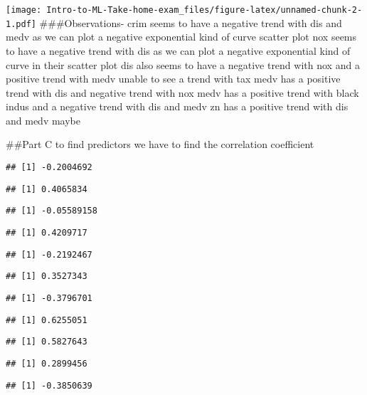 \documentclass[
]{article}
\begin{document}
\texttt{[image: Intro-to-ML-Take-home-exam\_files/figure-latex/unnamed-chunk-2-1.pdf]}
\#\#\#Observations- crim seems to have a negative trend with dis and
medv as we can plot a negative exponential kind of curve scatter plot
nox seems to have a negative trend with dis as we can plot a negative
exponential kind of curve in their scatter plot dis also seems to have a
negative trend with nox and a positive trend with medv unable to see a
trend with tax medv has a positive trend with dis and negative trend
with nox medv has a positive trend with black indus and a negative trend
with dis and medv zn has a positive trend with dis and medv maybe

\#\#Part C to find predictors we have to find the correlation
coefficient

\begin{verbatim}
## [1] -0.2004692
\end{verbatim}

\begin{verbatim}
## [1] 0.4065834
\end{verbatim}

\begin{verbatim}
## [1] -0.05589158
\end{verbatim}

\begin{verbatim}
## [1] 0.4209717
\end{verbatim}

\begin{verbatim}
## [1] -0.2192467
\end{verbatim}

\begin{verbatim}
## [1] 0.3527343
\end{verbatim}

\begin{verbatim}
## [1] -0.3796701
\end{verbatim}

\begin{verbatim}
## [1] 0.6255051
\end{verbatim}

\begin{verbatim}
## [1] 0.5827643
\end{verbatim}

\begin{verbatim}
## [1] 0.2899456
\end{verbatim}

\begin{verbatim}
## [1] -0.3850639
\end{verbatim}
\end{document}

